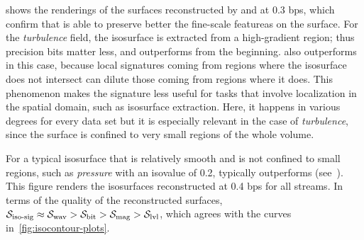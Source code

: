  shows the renderings of the surfaces reconstructed by \sbit
and \swav at 0.3 bps, which confirm that \sbit is able to preserve better the fine-scale featureas
on the surface. For the \emph{turbulence} field, the isosurface is extracted from a high-gradient
region; thus precision bits matter less, and \sbit outperforms \swav from the beginning. \sbit also
outperforms \sisg in this case, because local signatures coming from regions where the isosurface
does not intersect can dilute those coming from regions where it does. This phenomenon makes the
signature less useful for tasks that involve localization in the spatial domain, such as isosurface
extraction. Here, it happens in various degrees for every data set but it is especially relevant in
the case of \emph{turbulence}, since the surface is confined to very small regions of the whole
volume.

For a typical isosurface that is relatively smooth and is not confined to small regions, such as
\emph{pressure} with an isovalue of 0.2, \swav typically outperforms \sbit
(see~). This figure renders the isosurfaces reconstructed at
0.4 bps for all streams. In terms of the quality of the reconstructed surfaces, $\sisg \approx \swav
> \sbit > \smag > \slvl$, which agrees with the curves in~\autoref{fig:isocontour-plots}. 
